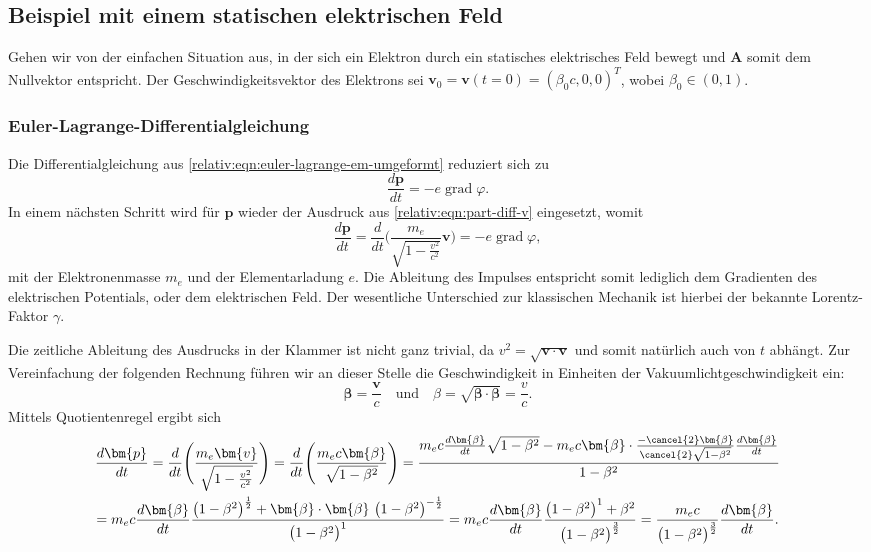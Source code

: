 \subsection{Beispiel mit einem statischen elektrischen Feld
\label{relativ:section:teilchen-konst-e-feld}}

Gehen wir von der einfachen Situation aus,
in der sich ein Elektron durch ein statisches
elektrisches Feld bewegt und \(\bm{A}\)
somit dem Nullvektor entspricht.
Der Geschwindigkeitsvektor des Elektrons sei
\(\bm{v}_0 = \bm{v}(t=0) =(\beta_0 c, 0, 0)^T\), wobei
\(\beta_0 \in (0, 1)\).

\subsubsection{Euler-Lagrange-Differentialgleichung}
Die Differentialgleichung aus \eqref{relativ:eqn:euler-lagrange-em-umgeformt} reduziert sich zu
\begin{equation}
    \frac{d\bm{p}}{dt} =
    - e \operatorname{grad} \varphi.
    \label{relativ:eqn:euler-lagrange-bsp-1}
\end{equation}
In einem nächsten Schritt wird für \(\bm{p}\)
wieder der Ausdruck aus \eqref{relativ:eqn:part-diff-v} eingesetzt,
womit
\begin{equation}
    \frac{d\bm{p}}{dt} =
    \frac{d}{dt} \Biggl(\frac{m_e}{\sqrt{1-\frac{v^2}{c^2}}} \bm{v}\Biggr) =
    - e \operatorname{grad} \varphi,
    \label{relativ:eqn:euler-lagrange-bsp-eingesetzt}
\end{equation}
mit der Elektronenmasse \(m_e\) und der Elementarladung \(e\).
Die Ableitung des Impulses entspricht somit lediglich
dem Gradienten des elektrischen Potentials, oder dem elektrischen Feld.
Der wesentliche Unterschied zur klassischen Mechanik ist hierbei
der bekannte Lorentz-Faktor \(\gamma\).

Die zeitliche Ableitung des Ausdrucks in der Klammer ist nicht ganz trivial,
da \(v^2=\sqrt{\bm{v}\cdot\bm{v}}\)
und somit natürlich auch von \(t\) abhängt.
Zur Vereinfachung der folgenden Rechnung führen wir an dieser Stelle
die Geschwindigkeit in Einheiten der Vakuumlichtgeschwindigkeit ein:
\begin{equation*}
    \bm{\beta} = \frac{\bm{v}}{c} \quad \text{und} \quad
    \beta = \sqrt{\bm{\beta}\cdot\bm{\beta}} = \frac{v}{c}.
\end{equation*}
Mittels Quotientenregel ergibt sich
\begin{multline*}
    \frac{d\bm{p}}{dt}
    = \frac{d}{dt} \Biggl(\frac{m_e \bm{v}}{\sqrt{1-\frac{v^2}{c^2}}}\Biggr)
    = \frac{d}{dt} \Biggl(\frac{m_e c \bm{\beta}}{\sqrt{1-\beta^2}}\Biggr)
    = \frac{m_ec\frac{d\bm{\beta}}{dt}\sqrt{1-\beta^2}
    -m_ec\bm{\beta}\cdot\frac{-\cancel{2}\bm{\beta}}{\cancel{2}\sqrt{1-\beta^2}}
    \frac{d\bm{\beta}}{dt}}{1-\beta^2}\\
    = m_ec\frac{d\bm{\beta}}{dt}\frac{\bigl(1-\beta^2\bigr)^\frac{1}{2}
    +\bm{\beta}\cdot\bm{\beta} \ \bigl(1-\beta^2\bigr)^{-\frac{1}{2}}}
    {\bigl(1-\beta^2\bigr)^1}
    = m_ec\frac{d\bm{\beta}}{dt}\frac{\bigl(1-\beta^2\bigr)^1
    +\beta^2}{\bigl(1-\beta^2\bigr)^\frac{3}{2}}
    = \frac{m_ec}{\bigl(1-\beta^2\bigr)^\frac{3}{2}}\frac{d\bm{\beta}}{dt}.
\end{multline*}

